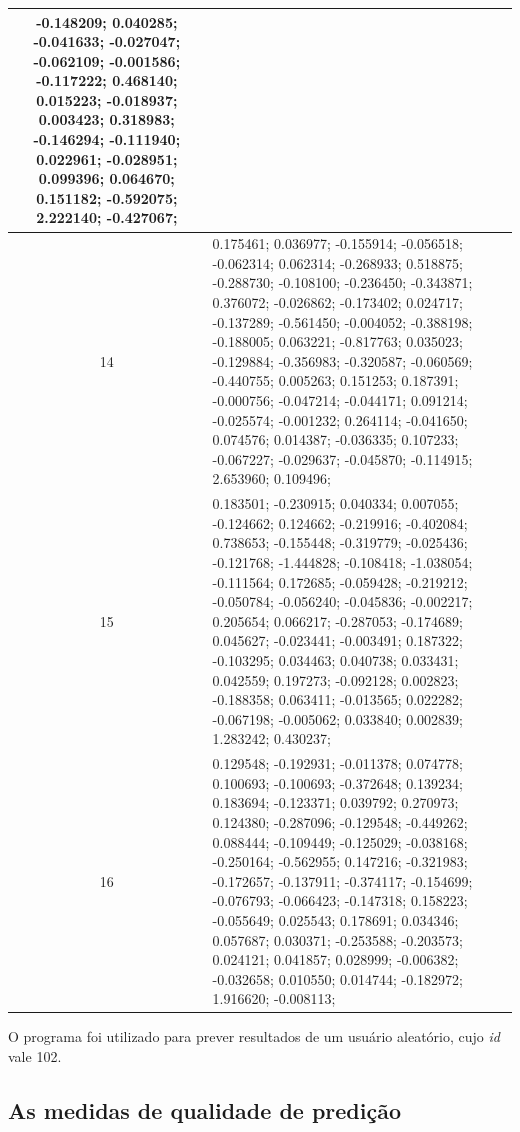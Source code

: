 {\begin{longtable}[h]{| c | p{} |}
	-0.148209; 0.040285; -0.041633; -0.027047; -0.062109; -0.001586; -0.117222;
	0.468140; 0.015223; -0.018937; 0.003423; 0.318983; -0.146294; -0.111940;
	0.022961; -0.028951; 0.099396; 0.064670; 0.151182; -0.592075; 2.222140;
	-0.427067;  \\ \hline
	14 & 0.175461; 0.036977; -0.155914; -0.056518; -0.062314; 0.062314; -0.268933;
	0.518875; -0.288730; -0.108100; -0.236450; -0.343871; 0.376072; -0.026862;
	-0.173402; 0.024717; -0.137289; -0.561450; -0.004052; -0.388198; -0.188005;
	0.063221; -0.817763; 0.035023; -0.129884; -0.356983; -0.320587; -0.060569;
	-0.440755; 0.005263; 0.151253; 0.187391; -0.000756; -0.047214; -0.044171;
	0.091214; -0.025574; -0.001232; 0.264114; -0.041650; 0.074576; 0.014387;
	-0.036335; 0.107233; -0.067227; -0.029637; -0.045870; -0.114915; 2.653960;
	0.109496; \\ \hline
	15 & 0.183501; -0.230915; 0.040334; 0.007055; -0.124662; 0.124662; -0.219916;
	-0.402084; 0.738653; -0.155448; -0.319779; -0.025436; -0.121768; -1.444828;
	-0.108418; -1.038054; -0.111564; 0.172685; -0.059428; -0.219212; -0.050784;
	-0.056240; -0.045836; -0.002217; 0.205654; 0.066217; -0.287053; -0.174689;
	0.045627; -0.023441; -0.003491; 0.187322; -0.103295; 0.034463; 0.040738;
	0.033431; 0.042559; 0.197273; -0.092128; 0.002823; -0.188358; 0.063411;
	-0.013565; 0.022282; -0.067198; -0.005062; 0.033840; 0.002839; 1.283242;
	0.430237;  \\ \hline
	16 & 0.129548; -0.192931; -0.011378; 0.074778; 0.100693; -0.100693; -0.372648;
	0.139234; 0.183694; -0.123371; 0.039792; 0.270973; 0.124380; -0.287096;
	-0.129548; -0.449262; 0.088444; -0.109449; -0.125029; -0.038168; -0.250164;
	-0.562955; 0.147216; -0.321983; -0.172657; -0.137911; -0.374117; -0.154699;
	-0.076793; -0.066423; -0.147318; 0.158223; -0.055649; 0.025543; 0.178691;
	0.034346; 0.057687; 0.030371; -0.253588; -0.203573; 0.024121; 0.041857;
	0.028999; -0.006382; -0.032658; 0.010550; 0.014744; -0.182972; 1.916620;
	-0.008113; \\ \hline
			    
	\end{longtable} }

\FloatBarrier


O programa foi utilizado para prever resultados de um usuário aleatório, cujo
\textit{id} vale 102.


\subsection {As medidas de qualidade de predição}

